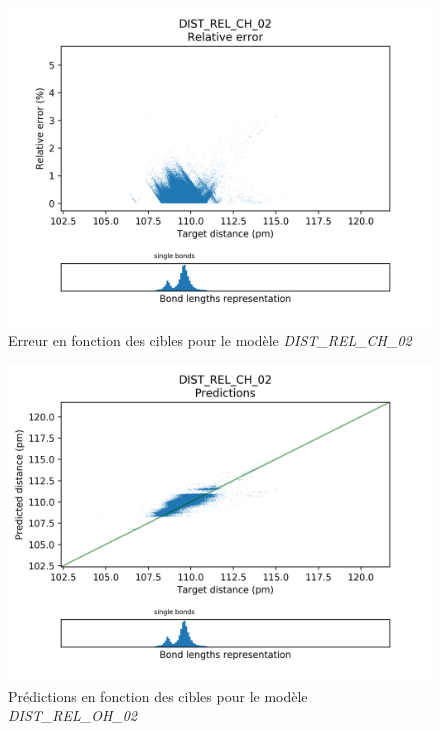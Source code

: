 \begin{figure}[!h]
	\centering
	
	\includegraphics[scale=0.8]{../figures/DIST_REL_CH_02/DIST_REL_CH_02_distrib_rmse_dist.png}	
	
	\caption{Erreur en fonction des cibles pour le modèle \emph{DIST\_REL\_CH\_02}}
\end{figure}

\begin{figure}[!h]
	\centering
	
	\includegraphics[scale=0.8]{../figures/DIST_REL_CH_02/DIST_REL_CH_02_preds_targets.png}	
	
	\caption{Prédictions en fonction des cibles pour le modèle \emph{DIST\_REL\_OH\_02}}
	
\end{figure}



